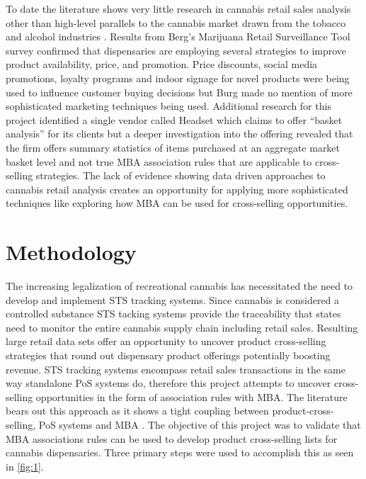 \documentclass[../article.tex, 12pt]{subfiles}
\begin{document}
\begin{multicols*}{2}
To date the literature shows very little research in cannabis retail sales analysis other than high-level parallels to the cannabis market drawn from the tobacco and alcohol industries \citep{berg2018emerging}. Results from Berg's Marijuana Retail Surveillance Tool survey confirmed that dispensaries are employing several strategies to improve product availability, price, and promotion. Price discounts, social media promotions, loyalty programs and indoor signage for novel products were being used to influence customer buying decisions but Burg made no mention of more sophisticated marketing techniques being used. Additional research for this project identified a single vendor called Headset which claims to offer ``basket analysis'' for its clients but a deeper investigation into the offering revealed that the firm offers summary statistics of items purchased at an aggregate market basket level and not true MBA association rules that are applicable to cross-selling strategies. The lack of evidence showing data driven approaches to cannabis retail analysis creates an opportunity for applying more sophisticated techniques like exploring how MBA can be used for cross-selling opportunities.

\section{Methodology}
\label{sec:methodology}

The increasing legalization of recreational cannabis has necessitated the need to develop and implement STS tracking systems. Since cannabis is considered a controlled substance STS tacking systems provide the traceability that states need to monitor the entire cannabis supply chain including retail sales. Resulting large retail data sets offer an opportunity to uncover product cross-selling strategies that round out dispensary product offerings potentially boosting revenue. STS tracking systems encompass retail sales transactions in the same way standalone PoS systems do, therefore this project attempts to uncover cross-selling opportunities in the form of association rules with MBA. The literature bears out this approach as it shows a tight coupling between product-cross-selling, PoS systems and MBA \citep{agrawal1994fast, kamakura2008cross, avcilar2014association, gupta2014survey}. The objective of this project was to validate that MBA associations rules can be used to develop product cross-selling lists for cannabis dispensaries. Three primary steps were used to accomplish this as seen in \autoref{fig:1}.


\end{multicols*}
\end{document}
